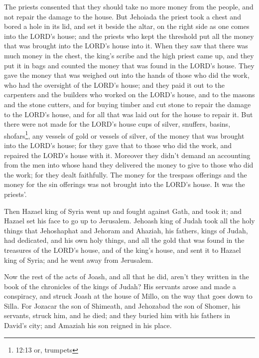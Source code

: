 \myverse{}The priests consented that they should take no more money from
the people, and not repair the damage to the house.
\myverse{}But Jehoiada the priest took a chest and bored a hole in its lid, and set it
beside the altar, on the right side as one comes into the LORD’s house; and the priests who kept the threshold
put all the money that was brought into the LORD’s house into it.
\myverse{}When they saw that there was much money in the chest, the king’s scribe and
the high priest came up, and they put it in bags and counted the money that was found in the LORD’s house.
\myverse{}They gave the money that was weighed out into the hands of those who did
the work, who had the oversight of the LORD’s house; and they paid it out to the carpenters and the builders
who worked on the LORD’s house,
\myverse{}and to the masons and the stone cutters, and for buying timber and cut stone
to repair the damage to the LORD’s house, and for all that was laid out for the house to repair it.
\myverse{}But there were not made for the LORD’s house cups of silver, snuffers, basins,
shofars\footnote{12:13 or, trumpets}, any vessels of gold or vessels of silver, of the money that was
brought into the LORD’s house;
\myverse{}for they gave that to those who did the work, and repaired the LORD’s house
with it.
\myverse{}Moreover they didn’t demand an accounting from the men into whose hand they
delivered the money to give to those who did the work; for they dealt faithfully.
\myverse{}The money for the trespass offerings and the money for the sin offerings
was not brought into the LORD’s house. It was the priests’.

\myverse{}Then Hazael king of Syria went up and fought against Gath, and
took it; and Hazael set his face to go up to Jerusalem.
\myverse{}Jehoash king of Judah took all the holy things that Jehoshaphat and Jehoram
and Ahaziah, his fathers, kings of Judah, had dedicated, and his own holy things, and all the gold that
was found in the treasures of the LORD’s house, and of the king’s house, and sent it to Hazael king of
Syria; and he went away from Jerusalem.

\myverse{}Now the rest of the acts of Joash, and all that he did, aren’t
they written in the book of the chronicles of the kings of Judah?
\myverse{}His servants arose and made a conspiracy, and struck Joash at the house of
Millo, on the way that goes down to Silla.
\myverse{}For Jozacar the son of Shimeath, and Jehozabad the son of Shomer, his servants,
struck him, and he died; and they buried him with his fathers in David’s city; and Amaziah his son reigned
in his place.


